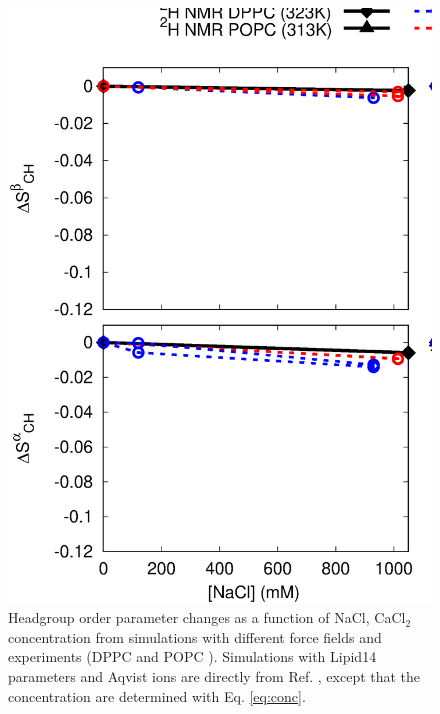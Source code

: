 \documentclass[aip,jcp,twocolumn]{revtex4}
\begin{document}
\begin{figure}[tbp]
  \centering
  \includegraphics[width=16.0cm]{../Fig/OrdParChanges_NaCl_CaCl2.eps}
  \caption{\label{OrderParameterCHANGESnewMODELS}
    Headgroup order parameter changes as a function of NaCl, CaCl$_2$ concentration
    from simulations with different force fields and experiments (DPPC \cite{akutsu81} and POPC \cite{altenbach84}).
    Simulations with Lipid14 parameters and Aqvist ions are directly from Ref. \cite{catte16}, except that
    the concentration are determined with Eq. \ref{eq:conc}.
  }
\end{figure}
\end{document}
